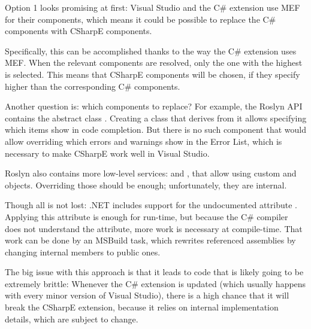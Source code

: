 Option 1 looks promising  at first: Visual Studio and the C\# extension use \ac{MEF} for their components, which means it could be possible to replace the C\# components with CSharpE components.

Specifically, this can be accomplished thanks to the way the C\# extension uses \ac{MEF}. When the relevant components are resolved, only the one with the highest  is selected. This means that CSharpE components will be chosen, if they specify higher  than the corresponding C\# components.

Another question is: which components to replace? For example, the Roslyn \ac{API} contains the abstract class . Creating a class that derives from it allows specifying which items show in code completion. But there is no such component that would allow overriding which errors and warnings show in the Error List, which is necessary to make CSharpE work well in Visual Studio.

Roslyn also contains more low-level services:  and , that allow using custom  and  objects. Overriding those should be enough; unfortunately, they are internal.

Though all is not lost: .NET includes support for the undocumented attribute . \cite{iacta} Applying this attribute is enough for run-time, but because the C\# compiler does not understand the attribute, more work is necessary at compile-time. That work can be done by an MSBuild task, which rewrites referenced assemblies by changing internal members to public ones.\footnotemark \cite{iactg}


The big issue with this approach is that it leads to code that is likely going to be extremely brittle: Whenever the C\# extension is updated (which usually happens with every minor version of Visual Studio), there is a high chance that it will break the CSharpE extension, because it relies on internal implementation details, which are subject to change.

